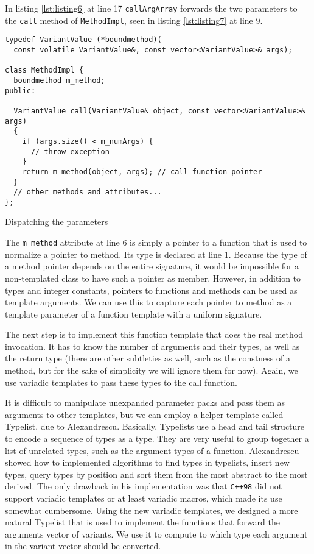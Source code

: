 In listing \ref{lst:listing6} at line 17 \texttt{callArgArray} forwards the two parameters to the \texttt{call} method of
\texttt{MethodImpl}, seen in listing \ref{lst:listing7} at line 9.

\begin{listing}[H]
\begin{verbatim}
typedef VariantValue (*boundmethod)(
  const volatile VariantValue&, const vector<VariantValue>& args);

class MethodImpl {
  boundmethod m_method;
public:

  VariantValue call(VariantValue& object, const vector<VariantValue>& args)
  {
    if (args.size() < m_numArgs) {
      // throw exception
    }
    return m_method(object, args); // call function pointer
  }
  // other methods and attributes...
};
\end{verbatim}
\caption{Dispatching the parameters}
\label{lst:listing7}
\end{listing}

The \texttt{m\_method} attribute at line 6 is simply a pointer to a function that is used to normalize a pointer to method.
Its type is declared at line 1. Because the type of a method pointer depends on the entire signature, it would be impossible
for a non-templated class to have such a pointer as member. However, in addition to types and integer constants, pointers to
functions and methods can be used as template arguments. We can use this to capture each pointer to method as a template
parameter of a function template with a uniform signature.

The next step is to implement this function template that does the real method invocation. It has to know the number of arguments
and their types, as well as the return type (there are other subtleties as well, such as the constness of a method,
but for the sake of simplicity we will ignore them for now). Again, we use variadic templates to pass these types to the call function.

It is difficult to manipulate unexpanded parameter packs and pass them as arguments to other templates, but we can employ a helper
template called Typelist, due to Alexandrescu\cite{Alexandrescu1}. Basically, Typelists use a head and tail structure to encode a sequence
of types as a type. They are very useful to group together a list of unrelated types, such as the argument types of a function.
Alexandrescu showed how to implemented algorithms to find types in typelists, insert new types, query types by position and sort
them from the most abstract to the most derived. The only drawback in his implementation was that \texttt{C++98} did not support
variadic templates or at least variadic macros, which made its use somewhat cumbersome. Using the new variadic templates, we designed
a more natural Typelist that is used to implement the functions that forward the arguments vector of variants. We use it to compute
to which type each argument in the variant vector should be converted.

